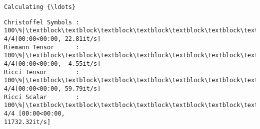 \documentclass[11pt]{article}
\newcommand{\prompt}[4]{
        {\ttfamily\llap{{\color{#2}[#3]:\hspace{3pt}#4}}\vspace{-\baselineskip}}
    }
\begin{document}
    \begin{Verbatim}[commandchars=\\\{\}]
Calculating {\ldots}
    \end{Verbatim}

    \begin{Verbatim}[commandchars=\\\{\}]
Christoffel Symbols : 100\%|\textblock\textblock\textblock\textblock\textblock\textblock\textblock\textblock\textblock\textblock\textblock\textblock\textblock\textblock\textblock\textblock\textblock\textblock\textblock\textblock\textblock\textblock\textblock\textblock\textblock\textblock\textblock\textblock\textblock\textblock\textblock\textblock\textblock\textblock\textblock| 4/4[00:00<00:00, 22.81it/s]
Riemann Tensor      : 100\%|\textblock\textblock\textblock\textblock\textblock\textblock\textblock\textblock\textblock\textblock\textblock\textblock\textblock\textblock\textblock\textblock\textblock\textblock\textblock\textblock\textblock\textblock\textblock\textblock\textblock\textblock\textblock\textblock\textblock\textblock\textblock\textblock\textblock\textblock\textblock| 4/4[00:00<00:00,  4.55it/s]
Ricci Tensor        : 100\%|\textblock\textblock\textblock\textblock\textblock\textblock\textblock\textblock\textblock\textblock\textblock\textblock\textblock\textblock\textblock\textblock\textblock\textblock\textblock\textblock\textblock\textblock\textblock\textblock\textblock\textblock\textblock\textblock\textblock\textblock\textblock\textblock\textblock\textblock\textblock| 4/4[00:00<00:00, 59.79it/s]
Ricci Scalar        : 100\%|\textblock\textblock\textblock\textblock\textblock\textblock\textblock\textblock\textblock\textblock\textblock\textblock\textblock\textblock\textblock\textblock\textblock\textblock\textblock\textblock\textblock\textblock\textblock\textblock\textblock\textblock\textblock\textblock\textblock\textblock\textblock\textblock| 4/4 [00:00<00:00,
11732.32it/s]
    \end{Verbatim}
 
            
\prompt{Out}{outcolor}{12}{}
    
\end{document}
